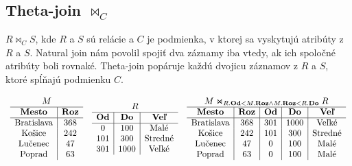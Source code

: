 \subsection*{\textbf{Theta-join $\Join_C$}} $R \Join_C S$, kde $R$ a $S$ sú relácie a $C$ je
podmienka, v ktorej sa vyskytujú atribúty z $R$ a $S$. Natural join nám povolil spojiť dva záznamy
iba vtedy, ak ich spoločné atribúty boli rovnaké. Theta-join popáruje každú dvojicu záznamov z $R$ a
$S$, ktoré spĺňajú podmienku $C$.
    \begin{priklad}
    \begin{center}
        \[
            \begin{array}{c c c}
                \begin{array}{c|c}
                \multicolumn{2}{c}{M} \\ \hline
                \textbf{Mesto}      & \textbf{Roz} \\ \hline
                \text{Bratislava}   & \text{368} \\
                \text{Košice}       & \text{242} \\
                \text{Lučenec}      & \text{47}  \\
                \text{Poprad}       & \text{63}  \\
                \end{array}
                &
                \begin{array}{c|c|c}
                \multicolumn{3}{c}{R} \\ \hline
                \textbf{Od} & \textbf{Do} & \textbf{Veľ}   \\ \hline
                0           & 100         & \text{Malé}    \\
                101         & 300         & \text{Stredné} \\
                301         & 1000        & \text{Veľké}   \\
                \end{array}
                &
                \begin{array}{c|c|c|c|c}
                \multicolumn{5}{c}{M \Join_{R.\textbf{Od} < M.\textbf{Roz} \land M.\textbf{Roz} < R.\textbf{Do}} R} \\ \hline
                \textbf{Mesto}    & \textbf{Roz} & \textbf{Od} & \textbf{Do} & \textbf{Veľ}   \\ \hline
                \text{Bratislava} & \text{368}   & 301         & 1000        & \text{Veľké}   \\
                \text{Košice}     & \text{242}   & 101         & 300         & \text{Stredné} \\
                \text{Lučenec}    & \text{47}    & 0           & 100         & \text{Malé}    \\
                \text{Poprad}     & \text{63}    & 0           & 100         & \text{Malé}    \\
                \end{array}
            \end{array}
        \]
    \end{center}
    \end{priklad}
    
